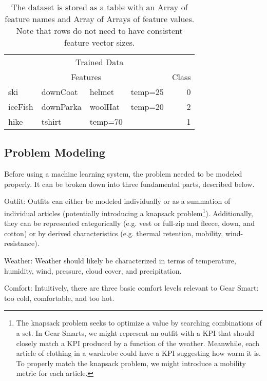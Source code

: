 \begin{table}
    \begin{tabular}{llllr}
        \hline
        \multicolumn{5}{c}{Trained Data} \\
        \multicolumn{4}{c}{Features} & Class \\
        \hline
        ski     & downCoat  & helmet      & temp=25  & 0 \\
        iceFish & downParka  & woolHat      & temp=20  & 2 \\
        hike    & tshirt & temp=70  & & 1 \\
        \hline
    \end{tabular}
    \caption{The dataset is stored as a table with an Array of feature names and Array of Arrays of feature values. Note that rows
    do not need to have consistent feature vector sizes.}
    \label{table:datarow}
\end{table}



\subsection{Problem Modeling}
Before using a machine learning system, the problem needed to be modeled properly. It can be broken down into three
fundamental parts, described below.

\begin{description}
  \item{Outfit:} Outfits can either be modeled individually or as a summation of individual articles (potentially introducing
  a knapsack problem\footnote{The knapsack problem seeks to optimize a value by searching combinations of a set. In Gear Smarts,
  we might represent an outfit with a KPI that should closely match a KPI produced by a function of the weather. Meanwhile, each
  article of clothing in a wardrobe could have a KPI suggesting how warm it is. To properly match the knapsack problem, we might
  introduce a mobility metric for each article.}).
  Additionally, they can be represented categorically (e.g. vest or full-zip and
  fleece, down, and cotton) or by derived characteristics (e.g. thermal retention, mobility, wind-resistance).
  \item{Weather:} Weather should likely be characterized in terms of temperature, humidity, wind, pressure,
  cloud cover, and precipitation.
  \item{Comfort:} Intuitively, there are three basic comfort levels relevant to Gear Smart: too cold, comfortable, and too hot.
\end{description}

